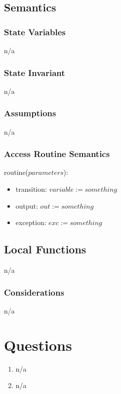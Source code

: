 \documentclass[12pt]{article}
\begin{document}
\subsection* {Semantics}
\subsubsection* {State Variables}
n/a

\subsubsection* {State Invariant}
n/a

\subsubsection* {Assumptions}
n/a

\subsubsection* {Access Routine Semantics}
\noindent routine($parameters$):
\begin{itemize}
    \item transition: $variable := something$
    \item output: $out := something$
    \item exception: $exc := something$
\end{itemize}


\subsection*{Local Functions}
n/a


\subsubsection* {Considerations}
n/a



\newpage
\section* {Questions}
\begin{enumerate}
    \item n/a
    \item n/a
\end{enumerate}
\end{document}
